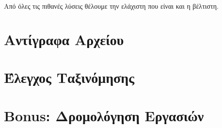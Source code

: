 \documentclass[a4paper,10pt]{article} \usepackage{anysize}
\begin{document}
Από όλες τις πιθανές λύσεις θέλουμε την ελάχιστη που είναι και η βέλτιστη.


\vspace{3cm}

\section{Αντίγραφα Αρχείου}


\vspace{3cm}

\section{Έλεγχος Ταξινόμησης}


\vspace{3cm}

\section{Bonus: Δρομολόγηση Εργασιών}
\end{document}
